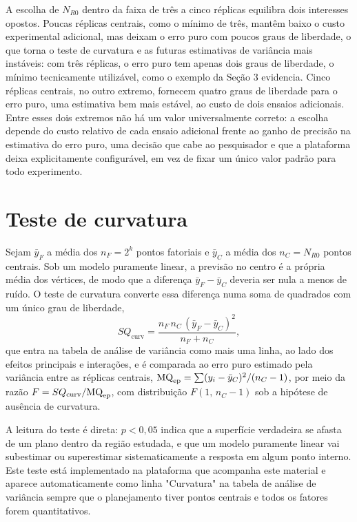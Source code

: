 \documentclass{doeapostila}
\begin{document}
A escolha de $N_{R0}$ dentro da faixa de três a cinco réplicas equilibra
dois interesses opostos. Poucas réplicas centrais, como o mínimo de três,
mantêm baixo o custo experimental adicional, mas deixam o erro puro com
poucos graus de liberdade, o que torna o teste de curvatura e as futuras
estimativas de variância mais instáveis: com três réplicas, o erro puro
tem apenas dois graus de liberdade, o mínimo tecnicamente utilizável, como
o exemplo da Seção 3 evidencia. Cinco réplicas centrais, no outro extremo,
fornecem quatro graus de liberdade para o erro puro, uma estimativa bem
mais estável, ao custo de dois ensaios adicionais. Entre esses dois
extremos não há um valor universalmente correto: a escolha depende do
custo relativo de cada ensaio adicional frente ao ganho de precisão na
estimativa do erro puro, uma decisão que cabe ao pesquisador e que a
plataforma deixa explicitamente configurável, em vez de fixar um único
valor padrão para todo experimento.

\section{Teste de curvatura}

Sejam $\bar{y}_{F}$ a média dos $n_{F} = 2^{k}$ pontos fatoriais e
$\bar{y}_{C}$ a média dos $n_{C} = N_{R0}$ pontos centrais. Sob um modelo
puramente linear, a previsão no centro é a própria média dos vértices, de
modo que a diferença $\bar{y}_{F} - \bar{y}_{C}$ deveria ser nula a menos de
ruído. O teste de curvatura converte essa diferença numa soma de quadrados
com um único grau de liberdade,
\begin{equation}
  SQ_{\mathrm{curv}} = \frac{n_{F}\, n_{C}\, (\bar{y}_{F} - \bar{y}_{C})^{2}}
                             {n_{F} + n_{C}} ,
  \label{eq:sqcurv}
\end{equation}
que entra na tabela de análise de variância como mais uma linha, ao lado dos
efeitos principais e interações, e é comparada ao erro puro estimado pela
variância entre as réplicas centrais, $\mathrm{MQ}_{\mathrm{ep}} = \sum(y_{i}-\bar{y}_{C})^{2}
/(n_{C}-1)$, por meio da razão $F = SQ_{\mathrm{curv}}/\mathrm{MQ}_{\mathrm{ep}}$, com
distribuição $F(1,\,n_{C}-1)$ sob a hipótese de ausência de curvatura.

A leitura do teste é direta: $p < 0{,}05$ indica que a superfície verdadeira
se afasta de um plano dentro da região estudada, e que um modelo puramente
linear vai subestimar ou superestimar sistematicamente a resposta em algum
ponto interno. Este teste está implementado na plataforma que acompanha este
material e aparece automaticamente como linha "Curvatura" na tabela de
análise de variância sempre que o planejamento tiver pontos centrais e todos
os fatores forem quantitativos.
\end{document}

